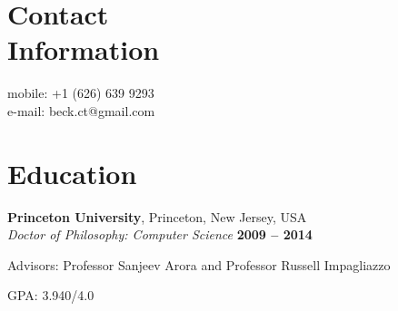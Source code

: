 \documentclass[margin,line]{resume}
\begin{document}
\begin{resume}

    \section{\mysidestyle Contact\\Information}

                                                          \hfill mobile: +1 (626) 639 9293          \vspace{0mm}\\\vspace{0mm}%
                                                          \hfill e-mail: beck.ct@gmail.com  \vspace{0mm}\\\vspace{-4.5mm}%





    \section{\mysidestyle Education}

    \textbf{Princeton University}, Princeton, New Jersey, USA \vspace{2mm}\\\vspace{1mm}%
    \textsl{Doctor of Philosophy: Computer Science} \hfill \textbf{ 2009 -- 2014 }\vspace{-3mm}\\\vspace{-1mm}%
    \begin{list2}
        \item Advisors:  Professor Sanjeev Arora and Professor Russell Impagliazzo
        \item GPA: 3.940/4.0
    \end{list2}\vspace{-1.5mm}


\end{resume}
\end{document}
